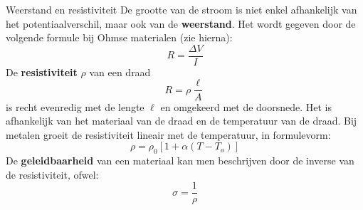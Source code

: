 \begin{theo}{Weerstand en resistiviteit}
    De grootte van de stroom is niet enkel afhankelijk van het potentiaalverschil, maar ook van de \textbf{weerstand}. Het wordt gegeven door de volgende formule bij Ohmse materialen (zie hierna):
    \begin{equation*}
        R = \dfrac{\Delta V}{I} 
    \end{equation*}
    De \textbf{resistiviteit} $\rho$ van een draad 
    \begin{equation*}
        R = \rho \dfrac{\ell}{A}
    \end{equation*}
    is recht evenredig met de lengte $\ell$ en omgekeerd met de doorsnede. Het is afhankelijk van het materiaal van de draad en de temperatuur van de draad. Bij metalen groeit de resistiviteit lineair met de temperatuur, in formulevorm:
    \begin{equation*}
        \rho = \rho_0[1+\alpha(T-T_o)]
    \end{equation*}
    De \textbf{geleidbaarheid} van een materiaal kan men beschrijven door de inverse van de resistiviteit, ofwel:
    \begin{equation*}
        \sigma = \dfrac{1}{\rho}
    \end{equation*}
    \vspace{-0.5cm}
\end{theo}

\newpage

